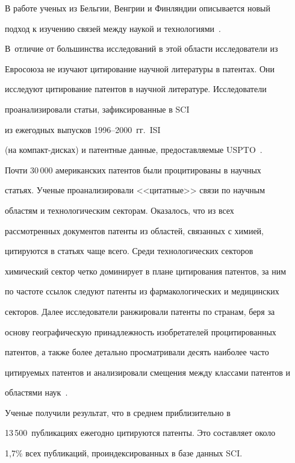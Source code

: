      


     В работе ученых из Бельгии, Венгрии и Финляндии описывается новый 


подход к изучению связей между наукой и технологиями~\cite{1-koz}. 


В~отличие от большинства исследований в этой области исследователи из 


Евросоюза не изуча\-ют цитирование научной литературы в патентах. Они 


исследуют цитирование патентов в научной литературе. Исследователи 


проанализировали статьи, зафиксированные в SCI 


из ежегодных выпусков 1996--2000~гг.\ ISI 


(на ком\-пакт-дис\-ках) и патентные данные, предоставляемые USPTO~\cite{22-koz}.


     


     Почти 30\,000 американских патентов были процитированы в научных 


стать\-ях. Ученые проанализировали <<цитатные>> связи по научным 


областям и технологическим секторам. Оказалось, что из всех 


рассмотренных документов патенты из областей, связанных с химией, 


цитируются в статьях чаще всего. Среди технологических секторов 


химический сектор четко доминирует в плане цитирования патентов, за ним 


по частоте ссылок следуют патенты из фармакологических и медицинских 


секторов. Далее исследователи ранжировали патенты по странам, беря за 


основу географическую принадлежность изобретателей процитированных 


патентов, а также более детально просматривали десять наиболее часто 


цити\-ру\-емых патентов и анализировали смещения между классами патентов и 


областями наук~\cite{22-koz}.


     


     Ученые получили результат, что в среднем приблизительно в 


13\,500~публикациях ежегодно цитируются патенты. Это составляет около 


1,7\% всех публикаций, проиндексированных в базе данных SCI. 


